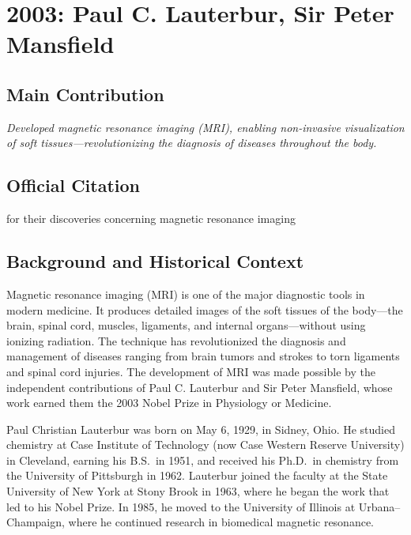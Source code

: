 \chapter[2003 --- Lauterbur et al.]{2003: Paul C. Lauterbur, Sir Peter Mansfield}
\label{ch:2003_Lauterbur}

\section*{Main Contribution}

\textit{Developed magnetic resonance imaging (MRI), enabling non-invasive visualization of soft tissues---revolutionizing the diagnosis of diseases throughout the body.}\cite{nobel-2003,lecture-2003}

\section{Official Citation}

for their discoveries concerning magnetic resonance imaging

\section{Background and Historical Context}

Magnetic resonance imaging (MRI) is one of the major diagnostic tools in modern medicine. It produces detailed images of the soft tissues of the body---the brain, spinal cord, muscles, ligaments, and internal organs---without using ionizing radiation. The technique has revolutionized the diagnosis and management of diseases ranging from brain tumors and strokes to torn ligaments and spinal cord injuries. The development of MRI was made possible by the independent contributions of Paul C. Lauterbur and Sir Peter Mansfield, whose work earned them the 2003 Nobel Prize in Physiology or Medicine.

Paul Christian Lauterbur was born on May 6, 1929, in Sidney, Ohio. He studied chemistry at Case Institute of Technology (now Case Western Reserve University) in Cleveland, earning his B.S.\ in 1951, and received his Ph.D.\ in chemistry from the University of Pittsburgh in 1962. Lauterbur joined the faculty at the State University of New York at Stony Brook in 1963, where he began the work that led to his Nobel Prize. In 1985, he moved to the University of Illinois at Urbana--Champaign, where he continued research in biomedical magnetic resonance.


